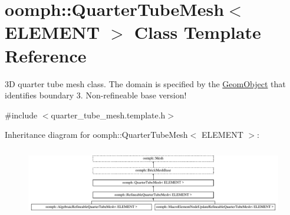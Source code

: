 \hypertarget{classoomph_1_1QuarterTubeMesh}{}\section{oomph\+:\+:Quarter\+Tube\+Mesh$<$ E\+L\+E\+M\+E\+NT $>$ Class Template Reference}
\label{classoomph_1_1QuarterTubeMesh}


3D quarter tube mesh class. The domain is specified by the \hyperlink{classoomph_1_1GeomObject}{Geom\+Object} that identifies boundary 3. Non-\/refineable base version!  




{\ttfamily \#include $<$quarter\+\_\+tube\+\_\+mesh.\+template.\+h$>$}

Inheritance diagram for oomph\+:\+:Quarter\+Tube\+Mesh$<$ E\+L\+E\+M\+E\+NT $>$\+:\begin{figure}[H]
\begin{center}
\leavevmode
\includegraphics[height=3.056768cm]{classoomph_1_1QuarterTubeMesh}
\end{center}
\end{figure}
